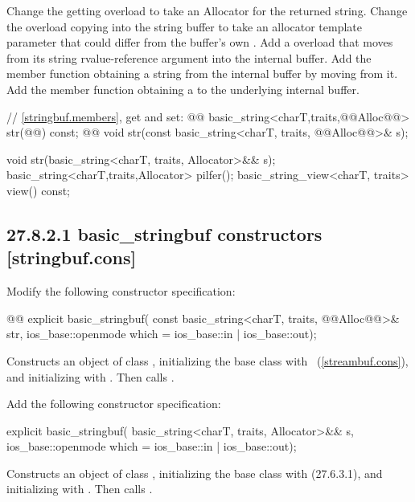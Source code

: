 \documentclass[ebook,11pt,article]{memoir}
\begin{document}
Change the getting  overload to take an Allocator for the returned string. 
Change the  overload copying into the string buffer to take an allocator template parameter that could differ from the buffer's own . 
Add a  overload that moves from its string rvalue-reference argument into the internal buffer.
Add the  member function obtaining a string from the internal buffer by moving from it. 
Add the  member function obtaining a  to the underlying internal buffer.

\begin{codeblock}
    // \ref{stringbuf.members}, get and set:
    @@
    basic_string<charT,traits,@@Alloc@@> str(@@) const;
    @@
    void str(const basic_string<charT, traits, @@Alloc@@>& s);
\end{codeblock}
\begin{addedblock}
\begin{codeblock}
    void str(basic_string<charT, traits, Allocator>&& s);
    basic_string<charT,traits,Allocator> pilfer();
    basic_string_view<charT, traits> view() const;
\end{codeblock}
\end{addedblock}

\subsection{27.8.2.1 basic\_stringbuf constructors [stringbuf.cons]}
Modify the following constructor specification:
\begin{itemdecl}
@@
explicit basic_stringbuf(
  const basic_string<charT, traits, @@Alloc@@>& str,
  ios_base::openmode which = ios_base::in | ios_base::out);
\end{itemdecl}

\begin{itemdescr}
\pnum
\effects
Constructs an object of class
,
initializing the base class with
~(\ref{streambuf.cons}), and initializing
with .
Then calls .
\end{itemdescr}

Add the following constructor specification:
\begin{insrt}
\begin{itemdecl}
      explicit basic_stringbuf(
        basic_string<charT, traits, Allocator>&& s,
        ios_base::openmode which = ios_base::in | ios_base::out);
\end{itemdecl}
\begin{itemdescr}
\pnum
\effects Constructs an object of class , initializing the base class with  (27.6.3.1), and initializing  with . Then calls .
\end{itemdescr}
\end{insrt}
\end{document}
